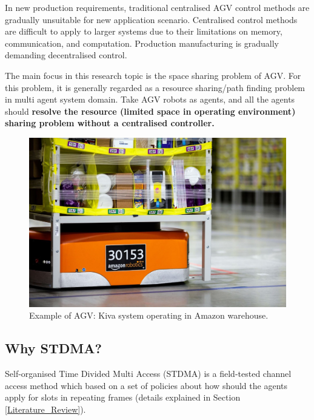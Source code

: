 \documentclass[12pt, oneside]{article}
\begin{document}

In new production requirements, traditional centralised AGV control methods are gradually unsuitable for new application scenario. Centralised control methods are difficult to apply to larger systems due to their limitations on memory, communication, and computation. Production manufacturing is gradually demanding decentralised control\cite{Industry4.0_decentralised}.


    The main focus in this research topic is the space sharing problem of AGV. For this problem, it is generally regarded as a resource sharing/path finding problem in multi agent system domain\cite{AGV_Review_2020}. Take AGV robots as agents, and all the agents should \textbf{resolve the resource (limited space in operating environment) sharing problem without a centralised controller.}

\begin{figure}
    \centering
    \includegraphics[width=0.6\linewidth]{figs/Amazon_Warehouse.jpeg}
    \caption{Example of AGV: Kiva system operating in Amazon warehouse.\footnotemark }
    \label{fig:Amazon Warehouse Robots}
\end{figure}


\subsection{Why STDMA?}

Self-organised Time Divided Multi Access (STDMA) is a field-tested \cite{STDMA_field_usage} channel access method which based on a set of policies about how  should the agents apply for slots in repeating frames (details explained in Section \ref{Literature_Review}). 
\end{document}

